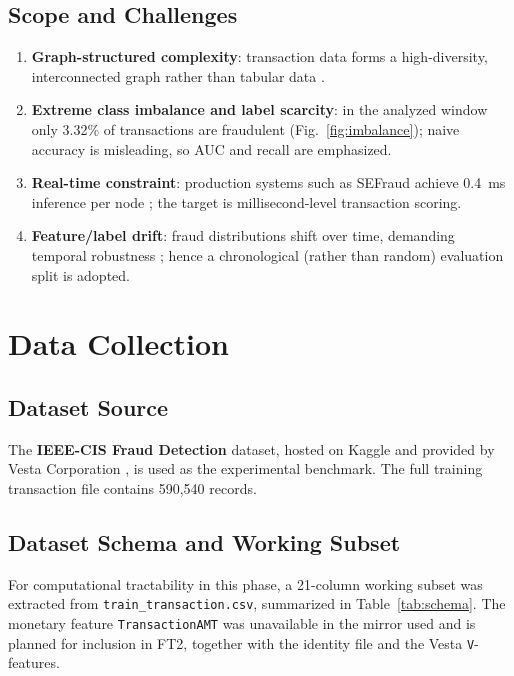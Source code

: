 \documentclass[conference]{IEEEtran}
\begin{document}
\subsection{Scope and Challenges}
\begin{enumerate}
  \item \textbf{Graph-structured complexity}: transaction data forms a
        high-diversity, interconnected graph rather than tabular data
        \cite{wang2026cosemignn}.
  \item \textbf{Extreme class imbalance and label scarcity}: in the
        analyzed window only 3.32\% of transactions are fraudulent
        (Fig.~\ref{fig:imbalance}); naive accuracy is misleading, so AUC
        and recall are emphasized.
  \item \textbf{Real-time constraint}: production systems such as SEFraud
        achieve 0.4~ms inference per node \cite{li2024sefraud}; the target
        is millisecond-level transaction scoring.
  \item \textbf{Feature/label drift}: fraud distributions shift over time,
        demanding temporal robustness \cite{wang2026cosemignn}; hence a
        chronological (rather than random) evaluation split is adopted.
\end{enumerate}

\section{Data Collection}
\subsection{Dataset Source}
The \textbf{IEEE-CIS Fraud Detection} dataset, hosted on Kaggle and
provided by Vesta Corporation \cite{ieee-cis}, is used as the experimental
benchmark. The full training transaction file contains 590{,}540 records.

\subsection{Dataset Schema and Working Subset}
For computational tractability in this phase, a 21-column working subset
was extracted from \texttt{train\_transaction.csv}, summarized in
Table~\ref{tab:schema}. The monetary feature \texttt{TransactionAMT} was
unavailable in the mirror used and is planned for inclusion in FT2,
together with the identity file and the Vesta \texttt{V}-features.
\end{document}
